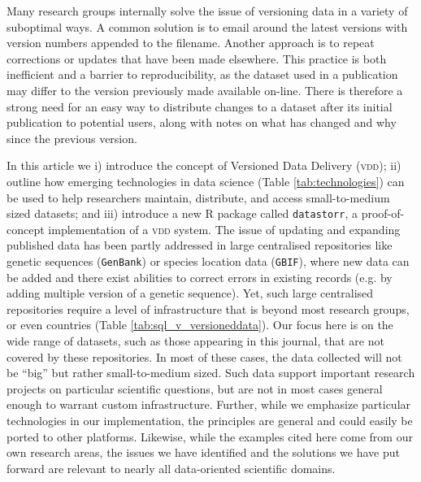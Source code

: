 \documentclass[a4paper,11pt]{article}
\begin{document}
Many research groups internally solve the issue of versioning data in a variety of suboptimal ways. A common solution is to email around the latest versions with version numbers appended to the filename. Another approach is to repeat corrections or updates that have been made elsewhere. This practice is both inefficient and a barrier to reproducibility, as the dataset used in a publication may differ to the version previously made available on-line. There is therefore a strong need for an easy way to distribute changes to a dataset after its initial publication to potential users, along with notes on what has changed and why since the previous version.

In this article we i) introduce the concept of Versioned Data Delivery (\textsc{vdd}); ii) outline how emerging technologies in data science (Table \ref{tab:technologies}) can be used to help researchers maintain, distribute, and access small-to-medium sized datasets; and iii) introduce a new \textsc{R} package called \texttt{datastorr}, a proof-of-concept implementation of a \textsc{vdd} system. The issue of updating and expanding published data has been partly addressed in large centralised repositories like genetic sequences (\texttt{GenBank}) or species location data (\texttt{GBIF}), where new data can be added and there exist abilities to correct errors in existing records (e.g. by adding multiple version of a genetic sequence). Yet, such large centralised repositories require a level of infrastructure that is beyond most research groups, or even countries (Table \ref{tab:sql_v_versioneddata}). Our focus here is on the wide range of datasets, such as those appearing in this journal, that are not covered by these repositories. In most of these cases, the data collected will not be ``big'' but rather small-to-medium sized. Such data support important research projects on particular scientific questions, but are not in most cases general enough to warrant custom infrastructure. Further, while we emphasize particular technologies in our implementation, the principles are general and could easily be ported to other platforms. Likewise, while the examples cited here come from our own research areas, the issues we have identified and the solutions we have put forward are relevant to nearly all data-oriented scientific domains.


\end{document}
